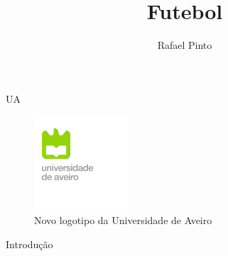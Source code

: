 \documentclass[11pt,a4paper,openright,twoside]{report}
\title{\textbf{Futebol}}
\author{Rafael Pinto}
\begin{document}
\maketitle
UA
\begin{figure}[h]\center
\includegraphics[height=100pt]{logoua}
\caption{Novo logotipo da Universidade de Aveiro}
\label{fig:ualogo}
\end{figure}

\maketitle
\huge Introdução
\end{document}
